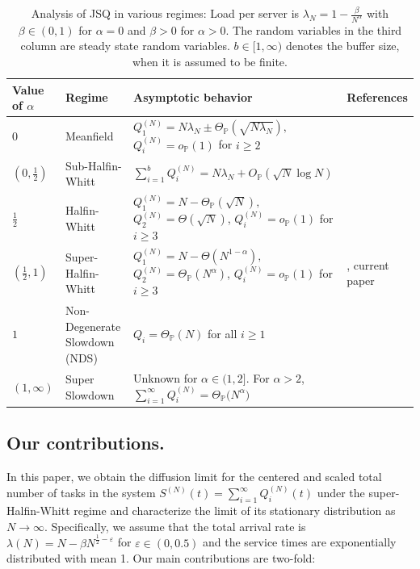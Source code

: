 \documentclass[11pt, reqno]{article}
\numberwithin{equation}{section}
\numberwithin{theorem}{section}
\def\sss{\scriptscriptstyle}
\newcommand{\PR}{\ensuremath{\mathbb{P}}}
\newcommand{\oP}{o_{\sss \PR}}
\newcommand{\OP}{O_{\sss \PR}}
\newcommand{\ThetaP}{\Theta_{\sss \PR}}
\def\sss{\scriptscriptstyle}
\begin{document}
\begin{table}[htb]
\def\arraystretch{1.2}
  \begin{tabular}{C{1.75cm}|L{4cm}|L{6.75cm}|L{2.5cm}}
    Value of $\alpha$ & Regime & Asymptotic behavior& References\\
    \hline
    $0$ & Meanfield & $Q_1^{(N)} = N\lambda_N \pm \ThetaP(\sqrt{N\lambda_N}),$ $Q_i^{(N)}= \oP(1)$ for $i\geq 2$  &\cite{MBLW16-3}\\
    $(0, \frac{1}{2})$ & Sub-Halfin-Whitt & $\sum_{i=1}^b Q_i^{(N)} = N\lambda_N + \OP(\sqrt{N}\log N)$ & \cite{LY19}\\
    $\frac{1}{2}$ & Halfin-Whitt & $Q_1^{(N)} = N - \ThetaP(\sqrt{N}),$ $Q_2^{(N)} = \Theta(\sqrt{N})$, $Q_i^{(N)}=\oP(1)$ for $i\geq 3$ &\cite{Braverman18, EG15, BM19a, BM19b} \\
    $(\frac{1}{2}, 1)$ & Super-Halfin-Whitt & $Q_1^{(N)} = N - \Theta(N^{1-\alpha}),$ $Q_2^{(N)} = \ThetaP(N^\alpha)$, $Q_i^{(N)}=\oP(1)$ for $i\geq 3$ & \cite{LY21}, current paper\\
    $1$ & Non-Degenerate Slowdown (NDS) &  $Q_i = \ThetaP(N)$ for all $i\geq 1$ &\cite{GW19} \\
    $(1, \infty)$ & Super Slowdown & Unknown for $\alpha\in (1,2]$.
    For $\alpha>2$, $\sum_{i=1}^\infty Q_i^{(N)} = \ThetaP\big(N^\alpha\big)$ & \cite{HM20, HM21}%
  \end{tabular}
  \caption{Analysis of JSQ in various regimes: Load per server is $\lambda_N = 1 - \frac{\beta}{N^{\alpha}}$ with
  $\beta\in (0,1)$ for $\alpha=0$ and
  $\beta>0$ for $\alpha>0$. The random variables in the third column are steady state random variables. $b \in [1, \infty)$ denotes the buffer size, when it is assumed to be finite.
  \label{tab:lit}}
\end{table}

\subsection{Our contributions.}
In this paper, we obtain the diffusion limit for the centered and scaled total number of tasks in the system $S^{(N)}(t) = \sum_{i=1}^\infty Q_i^{(N)}(t)$ under the super-Halfin-Whitt regime and characterize the limit of its stationary distribution as $N\rightarrow\infty$.
Specifically, we assume that the total arrival rate is $ \lambda(N)=N-\beta N^{\frac{1}{2}-\varepsilon}$ for $\varepsilon\in (0, 0.5)$ and the service times are exponentially distributed with mean 1.
Our main contributions are two-fold:
\end{document}
